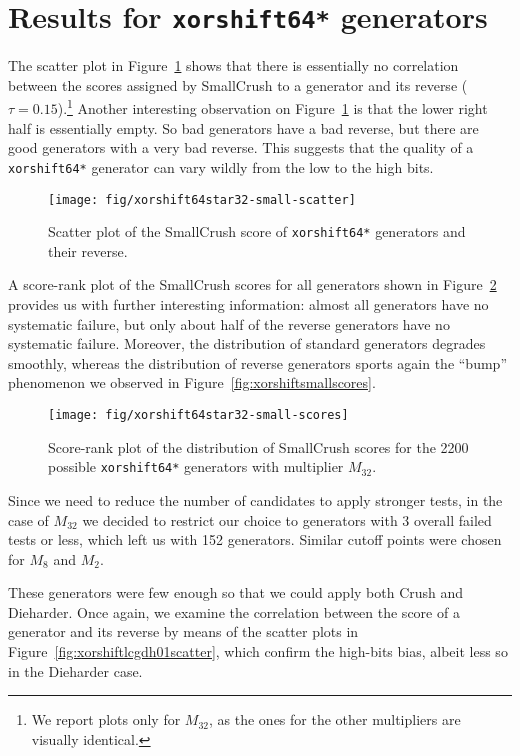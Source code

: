 \documentclass{acmsmalltr}
\newcommand{\xorshifts}[1][]{\texttt{xorshift#1*}\xspace}
\begin{document}
\section{Results for \xorshifts[64] generators}
\label{sec:resxorshifts}

The scatter plot in Figure~\ref{fig:xorshiftlcgcombscatter} shows that there is
essentially no correlation between the scores assigned by SmallCrush to a
generator and its reverse ($\tau=0.15$).\footnote{We report
plots only for $M_{32}$, as the ones for the other multipliers are visually identical.}
Another interesting observation on Figure~\ref{fig:xorshiftlcgcombscatter} is
that the lower right half is essentially empty. So bad generators have a bad
reverse, but there are good generators with a very bad reverse. This suggests
that the quality of a \xorshifts[64] generator can vary wildly from the low to the high bits.

\begin{figure}
\centering
\texttt{[image: fig/xorshift64star32-small-scatter]}
\caption{\label{fig:xorshiftlcgcombscatter}Scatter plot of the SmallCrush score
of \xorshifts[64] generators and their reverse.}
\end{figure}

A score-rank plot of the SmallCrush scores for all generators shown in
Figure~\ref{fig:xorshiftlcgsmallscores} provides us with further interesting
information: almost all generators have no systematic failure, but only about
half of the reverse generators have no systematic failure. Moreover, the
distribution of standard generators degrades smoothly, whereas the distribution
of reverse generators sports again the ``bump'' phenomenon we observed in
Figure~\ref{fig:xorshiftsmallscores}.

\begin{figure}
\centering
\texttt{[image: fig/xorshift64star32-small-scores]}
\caption{\label{fig:xorshiftlcgsmallscores}Score-rank plot of the distribution of SmallCrush scores for the 2200
possible \xorshifts[64] generators with multiplier $M_{32}$.}
\end{figure}



Since we need to reduce the number of candidates to apply stronger tests, in the case of $M_{32}$ we
decided to restrict our choice to generators with 3 overall failed tests or
less, which left us with 152 generators. Similar cutoff points were chosen for
$M_8$ and $M_2$.

These generators were few enough so that we could apply both Crush and
Dieharder. Once again, we examine the correlation between the score of a generator
and its reverse by means of the scatter plots in Figure~\ref{fig:xorshiftlcgdh01scatter},
which confirm the high-bits bias, albeit less so in the Dieharder case.
\end{document}
